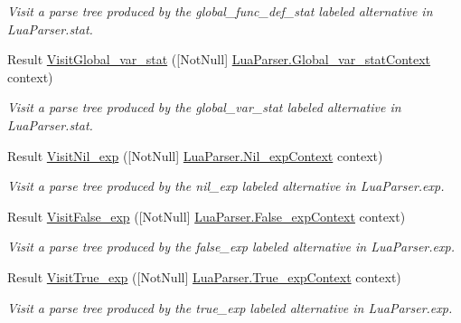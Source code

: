 \begin{DoxyCompactItemize}
\begin{DoxyCompactList}\small\item\em Visit a parse tree produced by the {\ttfamily global\+\_\+func\+\_\+def\+\_\+stat} labeled alternative in Lua\+Parser.\+stat. \end{DoxyCompactList}\item 
Result \mbox{\hyperlink{interfacezlua_1_1_i_lua_visitor_a6a56d5d3378a075a2ac40720cf317954}{Visit\+Global\+\_\+var\+\_\+stat}} (\mbox{[}Not\+Null\mbox{]} \mbox{\hyperlink{classzlua_1_1_lua_parser_1_1_global__var__stat_context}{Lua\+Parser.\+Global\+\_\+var\+\_\+stat\+Context}} context)
\begin{DoxyCompactList}\small\item\em Visit a parse tree produced by the {\ttfamily global\+\_\+var\+\_\+stat} labeled alternative in Lua\+Parser.\+stat. \end{DoxyCompactList}\item 
Result \mbox{\hyperlink{interfacezlua_1_1_i_lua_visitor_ae639ec945d2612029298b119ce63c23e}{Visit\+Nil\+\_\+exp}} (\mbox{[}Not\+Null\mbox{]} \mbox{\hyperlink{classzlua_1_1_lua_parser_1_1_nil__exp_context}{Lua\+Parser.\+Nil\+\_\+exp\+Context}} context)
\begin{DoxyCompactList}\small\item\em Visit a parse tree produced by the {\ttfamily nil\+\_\+exp} labeled alternative in Lua\+Parser.\+exp. \end{DoxyCompactList}\item 
Result \mbox{\hyperlink{interfacezlua_1_1_i_lua_visitor_ad1a1446a4713b3b0e796d4e15e6946fc}{Visit\+False\+\_\+exp}} (\mbox{[}Not\+Null\mbox{]} \mbox{\hyperlink{classzlua_1_1_lua_parser_1_1_false__exp_context}{Lua\+Parser.\+False\+\_\+exp\+Context}} context)
\begin{DoxyCompactList}\small\item\em Visit a parse tree produced by the {\ttfamily false\+\_\+exp} labeled alternative in Lua\+Parser.\+exp. \end{DoxyCompactList}\item 
Result \mbox{\hyperlink{interfacezlua_1_1_i_lua_visitor_acaf973648f49c466c44d3306915b0028}{Visit\+True\+\_\+exp}} (\mbox{[}Not\+Null\mbox{]} \mbox{\hyperlink{classzlua_1_1_lua_parser_1_1_true__exp_context}{Lua\+Parser.\+True\+\_\+exp\+Context}} context)
\begin{DoxyCompactList}\small\item\em Visit a parse tree produced by the {\ttfamily true\+\_\+exp} labeled alternative in Lua\+Parser.\+exp. \end{DoxyCompactList}\item 

\end{DoxyCompactItemize}
